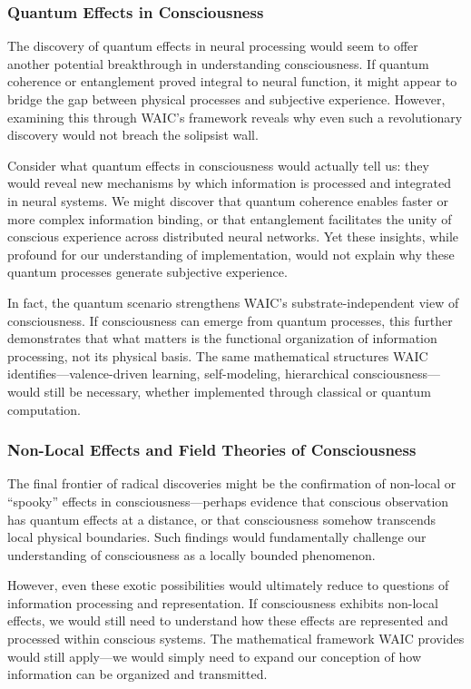 \documentclass[12pt,letterpaper]{article}
\begin{document}
\subsubsection{Quantum Effects in Consciousness}

The discovery of quantum effects in neural processing would seem to offer another potential breakthrough in understanding consciousness. If quantum coherence or entanglement proved integral to neural function, it might appear to bridge the gap between physical processes and subjective experience. However, examining this through WAIC's framework reveals why even such a revolutionary discovery would not breach the solipsist wall.

Consider what quantum effects in consciousness would actually tell us: they would reveal new mechanisms by which information is processed and integrated in neural systems. We might discover that quantum coherence enables faster or more complex information binding, or that entanglement facilitates the unity of conscious experience across distributed neural networks. Yet these insights, while profound for our understanding of implementation, would not explain why these quantum processes generate subjective experience.

In fact, the quantum scenario strengthens WAIC's substrate-independent view of consciousness. If consciousness can emerge from quantum processes, this further demonstrates that what matters is the functional organization of information processing, not its physical basis. The same mathematical structures WAIC identifies---valence-driven learning, self-modeling, hierarchical consciousness---would still be necessary, whether implemented through classical or quantum computation.

\subsubsection{Non-Local Effects and Field Theories of Consciousness}

The final frontier of radical discoveries might be the confirmation of non-local or ``spooky'' effects in consciousness---perhaps evidence that conscious observation has quantum effects at a distance, or that consciousness somehow transcends local physical boundaries. Such findings would fundamentally challenge our understanding of consciousness as a locally bounded phenomenon.

However, even these exotic possibilities would ultimately reduce to questions of information processing and representation. If consciousness exhibits non-local effects, we would still need to understand how these effects are represented and processed within conscious systems. The mathematical framework WAIC provides would still apply---we would simply need to expand our conception of how information can be organized and transmitted.
\end{document}
